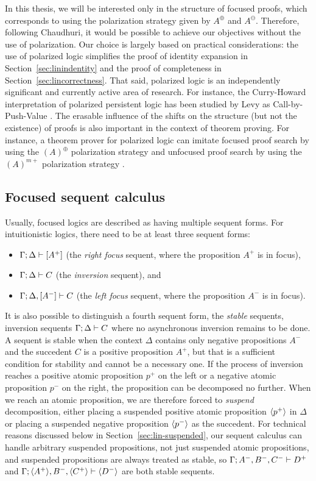 In this thesis, we will be interested only in the structure of focused
proofs, which corresponds to using the polarization strategy given by
$A^\oplus$ and $A^\ominus$. Therefore, following Chaudhuri, it would
be possible to achieve our objectives without the use of polarization.
Our choice is largely based on practical
considerations: the use of polarized logic simplifies the proof of
identity expansion in Section~\ref{sec:linindentity} and the proof of
completeness in Section~\ref{sec:lincorrectness}. That said, polarized
logic is an independently significant and currently active area of
research. For instance, the Curry-Howard
interpretation of polarized persistent logic has been studied by Levy
as Call-by-Push-Value \cite{levy04call}. The erasable influence of the
shifts on the structure (but not the existence) of proofs is also
important in the context of theorem proving. For instance, a theorem
prover for polarized logic can imitate focused proof search by using
the $(A)^\oplus$ polarization strategy and unfocused proof search by
using the $(A)^{m+}$ polarization strategy
\cite{mclaughlin09efficient}.

\subsection{Focused sequent calculus}
\label{sec:linfocseqcalcdef}

Usually, focused logics are described as having multiple sequent
forms. For intuitionistic logics, there need to be at least three
sequent forms:
\smallskip
\begin{itemize}
\item ${\Gamma};{\Delta} \vdash [{A^+}] \mathstrut$ (the {\it right focus} sequent, where
the proposition $A^+$ is in focus),
\item ${\Gamma};{\Delta} \vdash {C} \mathstrut$ (the {\it inversion} sequent), and
\item ${\Gamma};{\Delta}, [{A^-}] \vdash {C} \mathstrut$ (the {\it left focus} sequent,
where the proposition $A^-$ is in focus).
\end{itemize}
\smallskip
It is also possible to distinguish a fourth sequent form, the {\it
  stable} sequents, inversion sequents ${\Gamma};{\Delta} \vdash {C} \mathstrut$
where no asynchronous inversion remains to be done. A sequent 
is stable when the context $\Delta$ contains only negative propositions
$A^-$ and the succedent $C$ is a positive proposition $A^+$, but that
is a sufficient condition for stability and cannot be
a necessary one. If the process of inversion reaches a positive atomic
proposition $p^+$ on the left or a negative atomic proposition $p^-$
on the right, the proposition can be decomposed no further. When we
reach an atomic proposition, we are therefore forced to {\it suspend}
decomposition, either placing a suspended positive atomic proposition
$\langle {p^+} \rangle$ in $\Delta$ or placing a suspended negative proposition
$\langle {p^-} \rangle$ as the succedent. For technical reasons discussed below
in Section~\ref{sec:lin-suspended}, our sequent calculus can handle
arbitrary suspended propositions, not just  suspended atomic
propositions, and suspended propositions are always treated as stable,
so ${\Gamma};{A^-, B^-, C^-} \vdash {D^+} \mathstrut$ and
${\Gamma};{\langle {A^+} \rangle, B^-, \langle {C^+} \rangle} \vdash {\langle {D^-} \rangle} \mathstrut$ are both
stable sequents.


